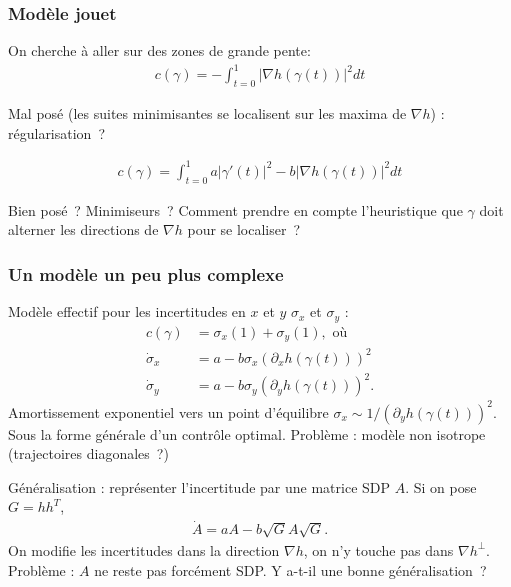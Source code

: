\documentclass[11pt]{beamer}
\begin{document}




\begin{frame}
  \frametitle{Modèle jouet}
  On cherche à aller sur des zones de grande pente:
  \begin{align*}
    c(\gamma) = -\int_{t=0}^{1} |\nabla h(\gamma(t))|^{2}  dt
  \end{align*}

  Mal posé (les suites minimisantes se localisent sur les maxima de
  $\nabla h$) : régularisation~?
  
\begin{align*}
  c(\gamma) =  \int_{t=0}^{1} a |\gamma'(t)|^{2} - b |\nabla
  h(\gamma(t))|^{2} dt
\end{align*}

Bien posé~? Minimiseurs~? Comment prendre en compte l'heuristique que
$\gamma$ doit alterner les directions de $\nabla h$ pour se localiser~?


\end{frame}
\begin{frame}
  \frametitle{Un modèle un peu plus complexe}
Modèle effectif pour les incertitudes en $x$ et $y$ $\sigma_{x}$ et
$\sigma_{y}$ :
\begin{align*}
  c(\gamma) &= \sigma_{x}(1) + \sigma_{y}(1), \text{ où}\\
  \dot \sigma_{x} &= a - b \sigma_{x} (\partial_{x} h(\gamma(t)))^{2}\\
  \dot \sigma_{y} &= a - b \sigma_{y} (\partial_{y} h(\gamma(t)))^{2}.
\end{align*}
Amortissement exponentiel vers un point d'équilibre $\sigma_{x} \sim
1/(\partial_{y} h(\gamma(t)))^{2}$. Sous la forme générale d'un
contrôle optimal. Problème : modèle non isotrope (trajectoires
diagonales~?)

Généralisation : représenter l'incertitude par une matrice SDP $A$. Si
on pose $G = h h^{T}$,
\begin{align*}
  \dot A = a A - b \sqrt G A \sqrt G.
\end{align*}
On modifie les incertitudes dans la direction $\nabla h$, on n'y
touche pas dans $\nabla h^{\perp}$. Problème : $A$ ne reste
pas forcément SDP. Y a-t-il une bonne généralisation~?
\end{frame}
\end{document}
